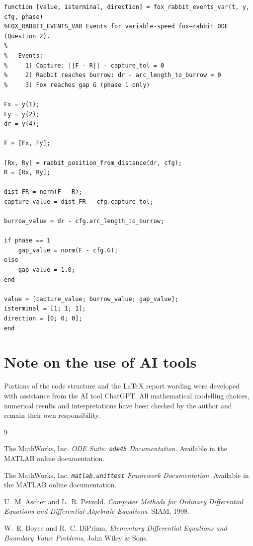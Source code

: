 \documentclass[a4paper,11pt]{article}
\begin{document}
{\footnotesize
\begin{verbatim}
function [value, isterminal, direction] = fox_rabbit_events_var(t, y, cfg, phase)
%FOX_RABBIT_EVENTS_VAR Events for variable-speed fox–rabbit ODE (Question 2).
%
%   Events:
%     1) Capture: ||F - R|| - capture_tol = 0
%     2) Rabbit reaches burrow: dr - arc_length_to_burrow = 0
%     3) Fox reaches gap G (phase 1 only)

Fx = y(1);
Fy = y(2);
dr = y(4);

F = [Fx, Fy];

[Rx, Ry] = rabbit_position_from_distance(dr, cfg);
R = [Rx, Ry];

dist_FR = norm(F - R);
capture_value = dist_FR - cfg.capture_tol;

burrow_value = dr - cfg.arc_length_to_burrow;

if phase == 1
    gap_value = norm(F - cfg.G);
else
    gap_value = 1.0;
end

value = [capture_value; burrow_value; gap_value];
isterminal = [1; 1; 1];
direction = [0; 0; 0];
end
\end{verbatim}
}

\section*{Note on the use of AI tools}

Portions of the code structure and the LaTeX report wording were developed with assistance from the AI tool ChatGPT. All mathematical modelling choices, numerical results and interpretations have been checked by the author and remain their own responsibility.

\begin{thebibliography}{9}

The MathWorks, Inc.
\newblock \emph{ODE Suite: \texttt{ode45} Documentation}.
\newblock Available in the MATLAB online documentation.

The MathWorks, Inc.
\newblock \emph{\texttt{matlab.unittest} Framework Documentation}.
\newblock Available in the MATLAB online documentation.

U.~M. Ascher and L.~R. Petzold.
\newblock \emph{Computer Methods for Ordinary Differential Equations and Differential-Algebraic Equations}.
\newblock SIAM, 1998.

W.~E. Boyce and R.~C. DiPrima,
\newblock \emph{Elementary Differential Equations and Boundary Value Problems}, John Wiley \& Sons.

\end{thebibliography}
\end{document}
